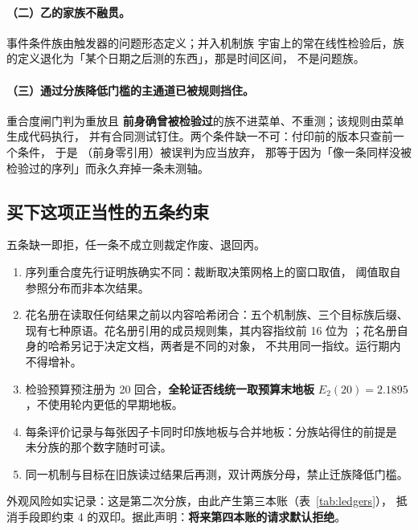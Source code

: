 \documentclass[11pt]{ctexart}
\begin{document}
\paragraph{（二）乙的家族不融贯。}事件条件族由触发器的问题形态定义；并入机制族
宇宙上的常在线性检验后，族的定义退化为「某个日期之后测的东西」，那是时间区间，
不是问题族。

\paragraph{（三）通过分族降低门槛的主通道已被规则挡住。}重合度闸门判为重放且
\textbf{前身确曾被检验过}的族不进菜单、不重测；该规则由菜单生成代码执行，
并有合同测试钉住。两个条件缺一不可：付印前的版本只查前一个条件，
于是 （前身零引用）被误判为应当放弃，
那等于因为「像一条同样没被检验过的序列」而永久弃掉一条未测轴。

\subsection{买下这项正当性的五条约束}
五条缺一即拒，任一条不成立则裁定作废、退回丙。
\begin{enumerate}\small
\item 序列重合度先行证明族确实不同：裁断取决策网格上的窗口取值，
阈值取自参照分布而非本次结果。
\item 花名册在读取任何结果之前以内容哈希闭合：五个机制族、三个目标族后缀、
现有七种原语。花名册引用的成员规则集，其内容指纹前 16 位为
；花名册自身的哈希另记于决定文档，两者是不同的对象，
不共用同一指纹。运行期内不得增补。
\item 检验预算预注册为 20 回合，\textbf{全轮证否线统一取预算末地板}
$E_2(20)=2.1895$，不使用轮内更低的早期地板。
\item 每条评价记录与每张因子卡同时印族地板与合并地板：分族站得住的前提是
未分族的那个数字随时可读。
\item 同一机制与目标在旧族读过结果后再测，双计两族分母，禁止迁族降低门槛。
\end{enumerate}
外观风险如实记录：这是第二次分族，由此产生第三本账（表~\ref{tab:ledgers}），
抵消手段即约束 4 的双印。据此声明：\textbf{将来第四本账的请求默认拒绝}。
\end{document}
